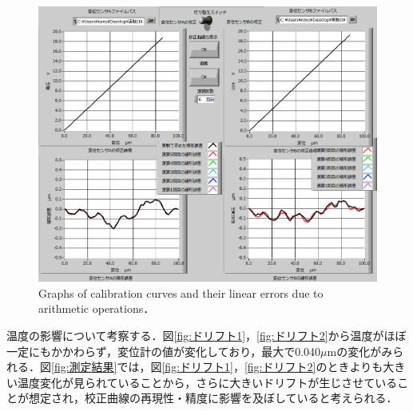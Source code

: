 \begin{figure}[htbp]
    \centering %
    \includegraphics[width=100truemm,clip]{fig/演算結果_A.png}
    \caption{Graphs of calibration curves and their linear errors due to arithmetic operations．}
    \label{fig:演算結果}
\end{figure}

温度の影響について考察する．図\ref{fig:ドリフト1}，\ref{fig:ドリフト2}から温度がほぼ一定にもかかわらず，変位計の値が変化しており，最大で0.040$\mu$mの変化がみられる．図\ref{fig:測定結果}では，図\ref{fig:ドリフト1}，\ref{fig:ドリフト2}のときよりも大きい温度変化が見られていることから，さらに大きいドリフトが生じさせていることが想定され，校正曲線の再現性・精度に影響を及ぼしていると考えられる．
